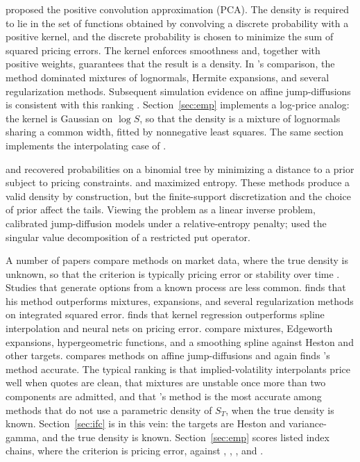 \documentclass[preprint,12pt,authoryear,times]{elsarticle}
\begin{document}
\citet{bondarenko2003} proposed the positive convolution approximation (PCA). The density is required to lie in the set of functions obtained by convolving a discrete probability with a positive kernel, and the discrete probability is chosen to minimize the sum of squared pricing errors. The kernel enforces smoothness and, together with positive weights, guarantees that the result is a density. In \citeauthor{bondarenko2003}'s comparison, the method dominated mixtures of lognormals, Hermite expansions, and several regularization methods. Subsequent simulation evidence on affine jump-diffusions is consistent with this ranking \citep{lu2019}. Section~\ref{sec:emp} implements a log-price analog: the kernel is Gaussian on \(\log S\), so that the density is a mixture of lognormals sharing a common width, fitted by nonnegative least squares. The same section implements the interpolating case of \citeauthor{yatchew2006}.

\citet{rubinstein1994} and \citet{jackwerth1996} recovered probabilities on a binomial tree by minimizing a distance to a prior subject to pricing constraints. \citet{stutzer1996} and \citet{buchen1996} maximized entropy. These methods produce a valid density by construction, but the finite-support discretization and the choice of prior affect the tails. Viewing the problem as a linear inverse problem, \citet{cont2004} calibrated jump-diffusion models under a relative-entropy penalty; \citet{monnier2014} used the singular value decomposition of a restricted put operator.

A number of papers compare methods on market data, where the true density is unknown, so that the criterion is typically pricing error or stability over time \citep{cooper1999,jondeau2000,coutant2001,anagnou2005,bliss2002,liu2007}. Studies that generate options from a known process are less common. \citet{bondarenko2003} finds that his method outperforms mixtures, expansions, and several regularization methods on integrated squared error. \citet{lai2014} finds that kernel regression outperforms spline interpolation and neural nets on pricing error. \citet{santos2015} compare mixtures, Edgeworth expansions, hypergeometric functions, and a \citeauthor{bliss2002} smoothing spline against Heston and other targets. \citet{lu2019} compares methods on affine jump-diffusions and again finds \citeauthor{bondarenko2003}'s method accurate. The typical ranking is that implied-volatility interpolants price well when quotes are clean, that mixtures are unstable once more than two components are admitted, and that \citeauthor{bondarenko2003}'s method is the most accurate among methods that do not use a parametric density of \(S_T\), when the true density is known. Section~\ref{sec:ifc} is in this vein: the targets are Heston and variance-gamma, and the true density is known. Section~\ref{sec:emp} scores listed index chains, where the criterion is pricing error, against \citeauthor{bondarenko2003}, \citeauthor{yatchew2006}, \citeauthor{aitsahalia2003}, and \citeauthor{priestley1972}.
\end{document}
